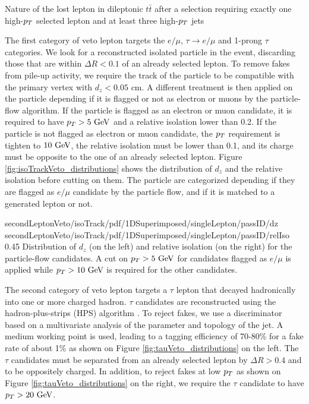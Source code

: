                  {Nature of the lost lepton in dileptonic $t\bar{t}$ after a selection
                 requiring exactly one high-$p_T$ selected lepton and at least three
                 high-$p_T$ jets}

    The first category of veto lepton targets the $e/\mu$, $\tau \rightarrow e/\mu$ and
    1-prong $\tau$ categories. We look for a reconstructed isolated particle in the event,
    discarding those that are within $\Delta R < 0.1$ of an already selected lepton. To
    remove fakes from pile-up activity, we require the track of the particle to be
    compatible with the primary vertex with $d_z < 0.05$ cm. A different treatment is then
    applied on the particle depending if it is flagged or not as electron or muons by the
    particle-flow algorithm. If the particle is flagged as an electron or muon candidate,
    it is required to have $p_T > 5~\text{GeV}$ and a relative isolation lower than 0.2.
    If the particle is not flagged as electron or muon candidate, the $p_T$ requirement
    is tighten to $10~\text{GeV}$, the relative isolation must be lower than 0.1, and its charge
    must be opposite to the one of an already selected lepton.
    Figure \ref{fig:isoTrackVeto_distributions} shows the distribution of $d_z$ and the
    relative isolation before cutting on them. The particle are categorized depending if
    they are flagged as $e/\mu$ candidate by the particle flow, and if it is matched to a
    generated lepton or not.

                     {secondLeptonVeto/isoTrack/pdf/1DSuperimposed/singleLepton/passID/dz}
                     {secondLeptonVeto/isoTrack/pdf/1DSuperimposed/singleLepton/passID/relIso}
                     {0.45}
                     {Distribution of $d_z$ (on the left) and relative isolation (on the right)
                     for the particle-flow candidates. A cut on $p_T > 5~\text{GeV}$ for candidates
                     flagged as $e/\mu$ is applied while $p_T > 10~\text{GeV}$ is required for
                     the other candidates.}

    The second category of veto lepton targets a $\tau$ lepton that decayed hadronically
    into one or more charged hadron. $\tau$ candidates are reconstructed using the
    hadron-plus-strips (HPS) algorithm . To reject fakes, we use a discriminator
    based on a multivariate analysis of the parameter and topology of the jet. A medium
    working point is used, leading to a tagging efficiency of 70-80\% for a fake rate of
    about 1\% as shown on Figure \ref{fig:tauVeto_distributions} on the left. The $\tau$
    candidates must be separated from an already selected lepton by $\Delta R > 0.4$ and
    to be oppositely charged. In addition, to reject fakes at low $p_T$ as shown on Figure
    \ref{fig:tauVeto_distributions} on the right, we require the $\tau$ candidate to have
    $p_T > 20~\text{GeV}$.

